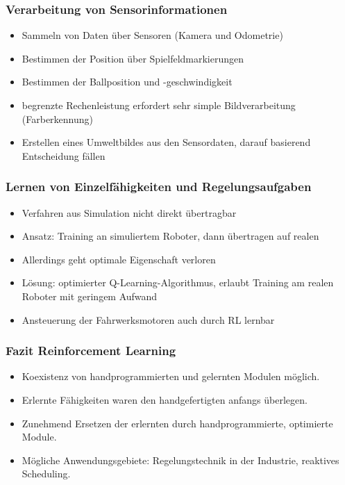 \begin{frame}
  \frametitle{Verarbeitung von Sensorinformationen}
  
  \begin{itemize}
    \item Sammeln von Daten über Sensoren (Kamera und Odometrie)
    \item Bestimmen der Position über Spielfeldmarkierungen
    \item Bestimmen der Ballposition und -geschwindigkeit
    \item begrenzte Rechenleistung erfordert sehr simple Bildverarbeitung
    (Farberkennung)
    \item Erstellen eines Umweltbildes aus den Sensordaten, darauf basierend
    Entscheidung fällen
  \end{itemize}
\end{frame}

\begin{frame}
  \frametitle{Lernen von Einzelfähigkeiten und Regelungsaufgaben}
  
  \begin{itemize}
    \item Verfahren aus Simulation nicht direkt übertragbar
    \item Ansatz: Training an simuliertem Roboter, dann übertragen auf realen
    \item Allerdings geht optimale Eigenschaft verloren
    \item Lösung: optimierter Q-Learning-Algorithmus, erlaubt Training am realen
    Roboter mit geringem Aufwand
    \item Ansteuerung der Fahrwerksmotoren auch durch RL lernbar
  \end{itemize}
\end{frame}

\begin{frame}
  \frametitle{Fazit Reinforcement Learning}
  
  \begin{itemize}
    \item Koexistenz von handprogrammierten und gelernten Modulen möglich.
    \item Erlernte Fähigkeiten waren den handgefertigten anfangs überlegen.
    \item Zunehmend Ersetzen der erlernten durch handprogrammierte, optimierte
    Module. 
    \item Mögliche Anwendungsgebiete: Regelungstechnik in der Industrie,
    reaktives Scheduling.
  \end{itemize}
\end{frame}

